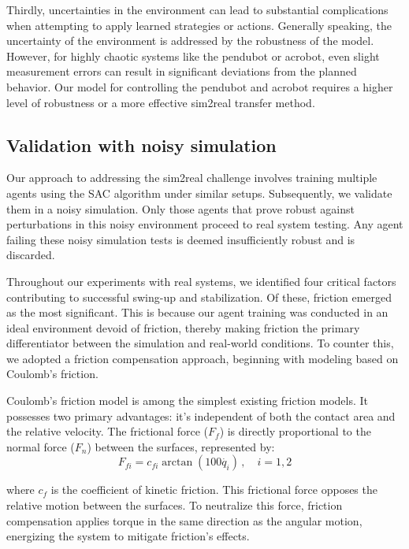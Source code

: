 Thirdly, uncertainties in the environment can lead to substantial complications when attempting to apply learned strategies or actions. Generally speaking, the uncertainty of the environment is addressed by the robustness of the model. However, for highly chaotic systems like the pendubot or acrobot, even slight measurement errors can result in significant deviations from the planned behavior. Our model for controlling the pendubot and acrobot requires a higher level of robustness or a more effective sim2real transfer method.

\subsection{Validation with noisy simulation}
Our approach to addressing the sim2real challenge involves training multiple agents using the SAC algorithm under similar setups. Subsequently, we validate them in a noisy simulation. Only those agents that prove robust against perturbations in this noisy environment proceed to real system testing. Any agent failing these noisy simulation tests is deemed insufficiently robust and is discarded.

Throughout our experiments with real systems, we identified four critical factors contributing to successful swing-up and stabilization. Of these, friction emerged as the most significant. This is because our agent training was conducted in an ideal environment devoid of friction, thereby making friction the primary differentiator between the simulation and real-world conditions. To counter this, we adopted a friction compensation approach, beginning with modeling based on Coulomb's friction.

Coulomb's friction model is among the simplest existing friction models. It possesses two primary advantages: it's independent of both the contact area and the relative velocity. The frictional force (\( F_f \)) is directly proportional to the normal force (\( F_n \)) between the surfaces, represented by:
\begin{equation}
F_{fi} = c_{fi} \arctan(100\dot{q_i})\, , \quad i = 1,2
\end{equation}

where \( c_f \) is the coefficient of kinetic friction. This frictional force opposes the relative motion between the surfaces. To neutralize this force, friction compensation applies torque in the same direction as the angular motion, energizing the system to mitigate friction's effects.

